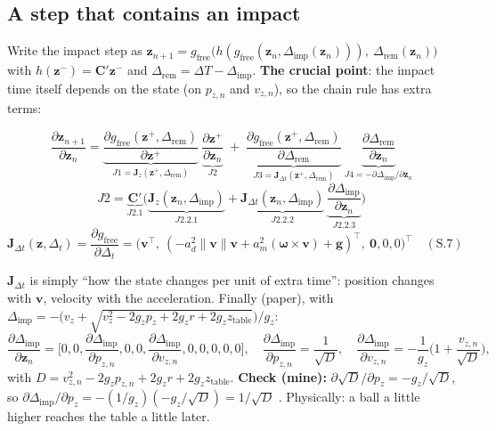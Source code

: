\documentclass[11pt,a4paper]{article}
\newcommand{\vv}{\mathbf{v}}
\newcommand{\zz}{\mathbf{z}}
\newcommand{\ww}{\boldsymbol{\omega}}
\begin{document}
\subsection{A step that contains an impact}
Write the impact step as $\zz_{n+1}=g_{\text{free}}\big(h(g_{\text{free}}(\zz_n,\Delta_{\text{imp}}(\zz_n))),\ \Delta_{\text{rem}}(\zz_n)\big)$ with $h(\zz^-)=\mathbf C'\zz^-$ and $\Delta_{\text{rem}}=\Delta T-\Delta_{\text{imp}}$.
\textbf{The crucial point}: the impact time itself depends on the state (on $p_{z,n}$ and $v_{z,n}$), so the chain rule has extra terms:
\begin{eqbox}
\[
\frac{\partial\zz_{n+1}}{\partial\zz_n}=\underbrace{\frac{\partial g_{\text{free}}(\zz^+,\Delta_{\text{rem}})}{\partial\zz^+}}_{J1=\mathbf J_z(\zz^+,\Delta_{\text{rem}})}\ \underbrace{\frac{\partial\zz^+}{\partial\zz_n}}_{J2}
\;+\;\underbrace{\frac{\partial g_{\text{free}}(\zz^+,\Delta_{\text{rem}})}{\partial\Delta_{\text{rem}}}}_{J3=\mathbf J_{\Delta t}(\zz^+,\Delta_{\text{rem}})}\ \underbrace{\frac{\partial\Delta_{\text{rem}}}{\partial\zz_n}}_{J4=-\partial\Delta_{\text{imp}}/\partial\zz_n}
\]
\[
J2=\underbrace{\mathbf C'}_{J2.1}\Big(\underbrace{\mathbf J_z(\zz_n,\Delta_{\text{imp}})}_{J2.2.1}+\underbrace{\mathbf J_{\Delta t}(\zz_n,\Delta_{\text{imp}})}_{J2.2.2}\ \underbrace{\frac{\partial\Delta_{\text{imp}}}{\partial\zz_n}}_{J2.2.3}\Big)
\]
\[
\mathbf J_{\Delta t}(\zz,\Delta_t)=\frac{\partial g_{\text{free}}}{\partial\Delta_t}=\big(\vv^\top,\ (-a_d^2\|\vv\|\vv+a_m^2(\ww\times\vv)+\mathbf g)^\top,\ \mathbf 0,0,0\big)^\top \quad(\text{S.7})
\]
\end{eqbox}
$\mathbf J_{\Delta t}$ is simply ``how the state changes per unit of extra time'': position changes with $\vv$, velocity with the acceleration. Finally (paper), with $\Delta_{\text{imp}}=-\big(v_{z}+\sqrt{v_z^2-2g_zp_z+2g_zr+2g_zz_{\text{table}}}\big)/g_z$:
\[
\frac{\partial\Delta_{\text{imp}}}{\partial\zz_n}=\Big[0,0,\frac{\partial\Delta_{\text{imp}}}{\partial p_{z,n}},0,0,\frac{\partial\Delta_{\text{imp}}}{\partial v_{z,n}},0,0,0,0,0\Big],\quad
\frac{\partial\Delta_{\text{imp}}}{\partial p_{z,n}}=\frac{1}{\sqrt{D}},\quad\frac{\partial\Delta_{\text{imp}}}{\partial v_{z,n}}=-\frac1{g_z}\Big(1+\frac{v_{z,n}}{\sqrt D}\Big),
\]
with $D=v_{z,n}^2-2g_zp_{z,n}+2g_zr+2g_zz_{\text{table}}$.
\textbf{Check (mine):} $\partial\sqrt D/\partial p_z=-g_z/\sqrt D$, so $\partial\Delta_{\text{imp}}/\partial p_z=-(1/g_z)(-g_z/\sqrt D)=1/\sqrt D$ \checkmark. Physically: a ball a little higher reaches the table a little later.
\end{document}
